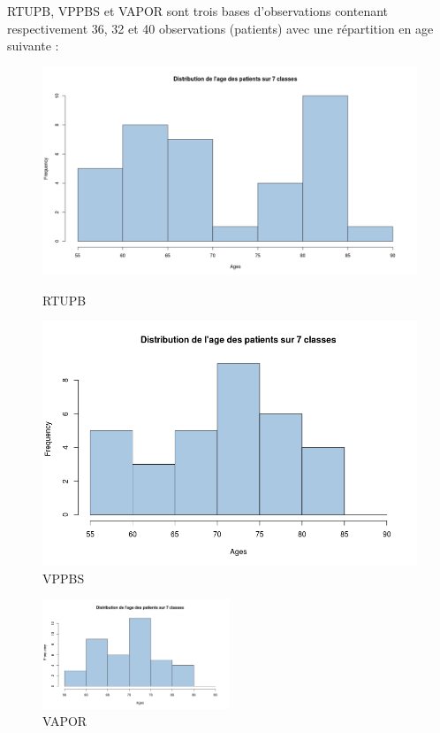 %
%

RTUPB, VPPBS et VAPOR sont trois bases d'observations contenant respectivement 36, 32 et 40 observations (patients) avec une répartition en age suivante : 

\begin{figure}[h]
    \begin{minipage}[c]{.46\linewidth}
        \centering
        \includegraphics[width=1\textwidth]{../Fig/RTUPB/rtupb-age-frequency}
        \caption{RTUPB}
    \end{minipage}
    \hfill%
    \begin{minipage}[c]{.46\linewidth}
        \centering
        \includegraphics[width=1\textwidth]{../Fig/VPPBS/vppbs-age-frequency.png}
        \caption{VPPBS}
    \end{minipage}
\end{figure}


\begin{figure}[H]
\centering
\includegraphics[width=0.50\textwidth]{../Fig/VAPOR/vapor-age-frequency}
\caption{VAPOR}
\end{figure}


%

